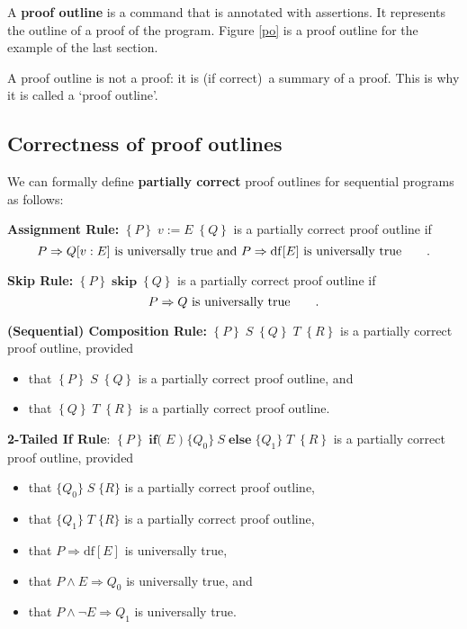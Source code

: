\documentclass[muchmore,11pt]{article}%
\begin{document}
A \textbf{proof outline} is a command that is annotated with assertions. It
represents the outline of a proof of the program. Figure \ref{po} is a proof
outline for the example of the last section.

A proof outline is not a proof: it is (if correct)\ a summary of a proof. This
is why it is called a `proof outline'.

\subsection{Correctness of proof outlines}

We can formally define \textbf{partially correct} proof outlines for
sequential programs as follows:

\textbf{Assignment Rule:} $\left\{  P\right\}  \;v:=E\;\left\{  Q\right\}  $
is a partially correct proof outline if
\[
P\Rightarrow Q[v:E]\text{ is universally true and }P\Rightarrow\mathrm{df}%
[E]\text{ is universally true\qquad.}%
\]


\textbf{Skip Rule:} $\left\{  P\right\}  \;\mathbf{skip}\;\left\{  Q\right\}
$ is a partially correct proof outline if%
\[
P\Rightarrow Q\text{ is universally true\qquad.}%
\]


\textbf{(Sequential) Composition Rule:} $\left\{  P\right\}  \;S\;\left\{
Q\right\}  \;T\;\left\{  R\right\}  $ is a partially correct proof outline, provided

\begin{itemize}
\item that $\left\{  P\right\}  \;S\;\left\{  Q\right\}  $ is a partially
correct proof outline, and

\item that $\left\{  Q\right\}  \;T\;\left\{  R\right\}  $ is a partially
correct proof outline.
\end{itemize}

\textbf{2-Tailed If Rule}: $\left\{  P\right\}  \;\mathbf{if(}\;E\;)\;\{Q_{0}%
\}\ S\;\mathbf{else}\;\{Q_{1}\}\;T\;\left\{  R\right\}  $ is a partially
correct proof outline, provided

\begin{itemize}
\item that $\{Q_{0}\}\;S\;\{R\}$ is a partially correct proof outline,

\item that $\{Q_{1}\}\;T\;\{R\}$ is a partially correct proof outline,

\item that $P\Rightarrow\mathrm{df}[E]$ is universally true,

\item that $P\wedge E\Rightarrow Q_{0}$ is universally true, and

\item that $P\wedge\lnot E\Rightarrow Q_{1}$ is universally true.
\end{itemize}
\end{document}
